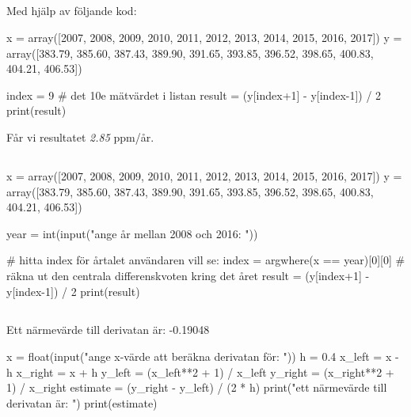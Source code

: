 
\subsection*{}

Med hjälp av följande kod:
\vspace{10pt}
\begin{python}
x = array([2007, 2008, 2009, 2010, 2011, 2012, 2013, 2014, 2015, 2016, 2017])
y = array([383.79, 385.60, 387.43, 389.90, 391.65, 393.85, 396.52, 398.65, 400.83, 404.21, 406.53])

index = 9 # det 10e mätvärdet i listan
result = (y[index+1] - y[index-1]) / 2
print(result)
\end{python}

Får vi resultatet \emph{2.85} ppm/år.

\subsection*{}
\vspace{3pt}
\begin{python}
x = array([2007, 2008, 2009, 2010, 2011, 2012, 2013, 2014, 2015, 2016, 2017])
y = array([383.79, 385.60, 387.43, 389.90, 391.65, 393.85, 396.52, 398.65, 400.83, 404.21, 406.53])

year = int(input("ange år mellan 2008 och 2016: "))

# hitta index för årtalet användaren vill se:
index = argwhere(x == year)[0][0]
# räkna ut den centrala differenskvoten kring det året
result = (y[index+1] - y[index-1]) / 2
print(result)
\end{python}


\subsection*{}
Ett närmevärde till derivatan är: -0.19048
\vspace{10pt}
\begin{python}
x = float(input("ange x-värde att beräkna derivatan för: "))
h = 0.4
x_left  = x - h
x_right = x + h
y_left  = (x_left**2 + 1) / x_left
y_right = (x_right**2 + 1) / x_right
estimate = (y_right - y_left) / (2 * h)
print("ett närmevärde till derivatan är: ")
print(estimate)
\end{python}


